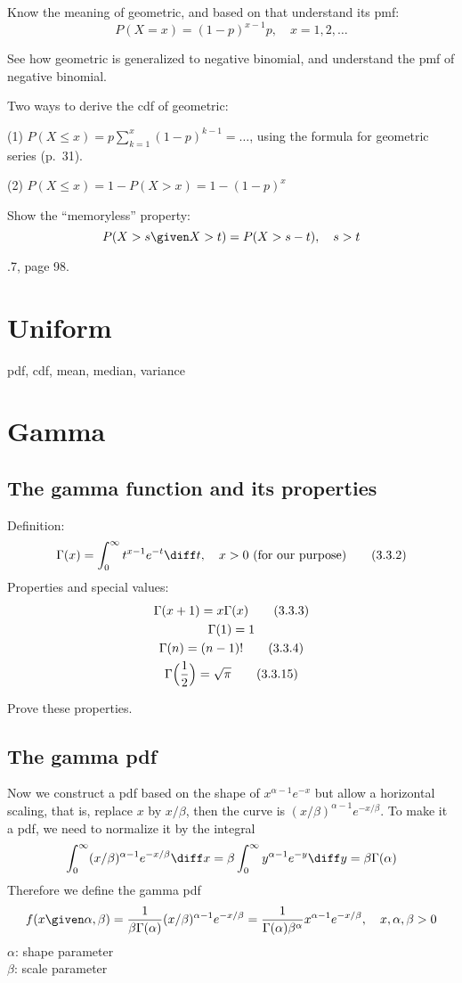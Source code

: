 \documentclass[12pt]{article}
\begin{document}
Know the meaning of geometric, and based on that understand its pmf:
\[
P(X = x) = (1-p)^{x-1} p
,\quad
x=1,2,\dotso
\]

\exercise
See how geometric is generalized to negative binomial,
and understand the pmf of negative binomial.

Two ways to derive the cdf of geometric:

(1) $P(X \le x) = p \sum_{k=1}^x (1-p)^{k-1} =\dotso$,
using the formula for geometric series (p.~31).

(2) $P(X \le x) = 1 - P(X > x) = 1 - (1-p)^x$

\example
Show the ``memoryless'' property:
\[
P(X > s\given X > t) = P(X > s-t)
,\quad
s > t
\]

.7, page 98.

\section{Uniform}

pdf, cdf, mean, median, variance

\section{Gamma}

\subsection{The gamma function and its properties}
Definition:
\[
\Gamma(x) = \int_0^\infty t^{x-1} e^{-t}\diff t
,\quad
x > 0 \text{ (for our purpose)}
\tag{3.3.2}
\]
Properties and special values:
\begin{gather}
\Gamma(x + 1) = x\Gamma(x)
\tag{3.3.3}
\\
\Gamma(1) = 1
\notag
\\
\Gamma(n) = (n-1)!
\tag{3.3.4}
\\
\Gamma\Bigl(\frac{1}{2}\Bigr) = \sqrt{\pi}
\tag{3.3.15}
\end{gather}

\exercise Prove these properties.

\subsection{The gamma pdf}

Now we construct a pdf based on the shape of
$x^{\alpha - 1} e^{-x}$
but allow a horizontal scaling, that is,
replace $x$ by $x/\beta$, then the curve is
$(x/\beta)^{\alpha - 1} e^{-x/\beta}$.
To make it a pdf, we need to normalize it by the integral
\[
\int_0^\infty (x/\beta)^{\alpha - 1} e^{-x/\beta} \diff x
= \beta \int_0^\infty y^{\alpha-1} e^{-y} \diff y
= \beta \Gamma(\alpha)
\]
Therefore we define the gamma pdf
\[
f(x\given \alpha, \beta)
= \frac{1}{\beta\Gamma(\alpha)} (x/\beta)^{\alpha-1} e^{-x/\beta}
= \frac{1}{\Gamma(\alpha) \beta^{\alpha}} x^{\alpha-1} e^{-x/\beta}
,\quad
x, \alpha, \beta > 0
\]
$\alpha$: shape parameter\\
$\beta$: scale parameter
\end{document}

